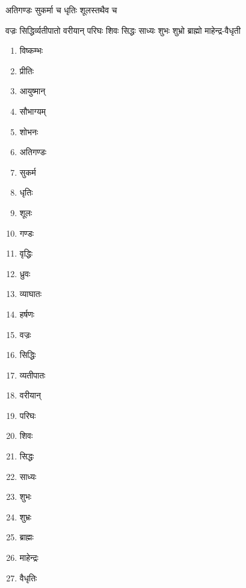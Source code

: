 \label{app:yoga_names}

{अतिगण्डः सुकर्मा च धृतिः शूलस्तथैव च}

{वज्रः सिद्धिर्व्यतीपातो वरीयान् परिघः शिवः}
{सिद्धः साध्यः शुभः शुभ्रो ब्राह्मो माहेन्द्र-वैधृती}

\begin{multicols}{2}
\begin{enumerate}
\item विष्कम्भः
\item प्रीतिः
\item आयुष्मान्
\item सौभाग्यम्
\item शोभनः
\item अतिगण्डः
\item सुकर्म
\item धृतिः
\item शूलः
\item गण्डः
\item वृद्धिः
\item ध्रुवः
\item व्याघातः
\item हर्षणः
\item वज्रः
\item सिद्धिः
\item व्यतीपातः
\item वरीयान्
\item परिघः
\item शिवः
\item सिद्धः
\item साध्यः
\item शुभः
\item शुभ्रः
\item ब्राह्मः
\item माहेन्द्रः
\item वैधृतिः
\end{enumerate}
\end{multicols}